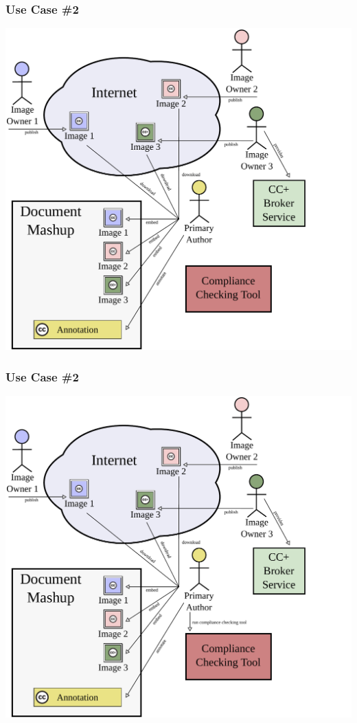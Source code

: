 \documentclass[mathserif,xcolor=dvipsnames,hyperref={bookmarks=true}]{beamer}
\begin{document}
    \begin{frame}[t]
        \frametitle{Use Case \#2}
        \begin{center}
            \includegraphics[width=0.9\textheight]{../resources/usecases/usecase2/usecase2-step26.pdf}
        \end{center}
    \end{frame}
    \begin{frame}[t]
        \frametitle{Use Case \#2}
        \begin{center}
            \includegraphics[width=0.9\textheight]{../resources/usecases/usecase2/usecase2-step27.pdf}
        \end{center}
    \end{frame}
\end{document}
